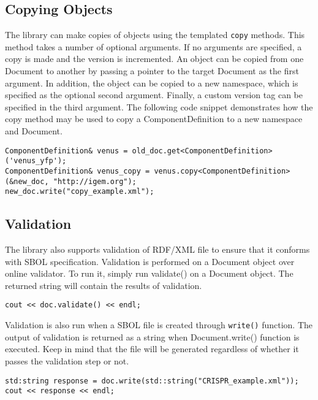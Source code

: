 \subsection*{Copying Objects}
The library can make copies of  objects using the templated \lstinline+copy+ methods.  This method takes a number of optional arguments. If no arguments are specified, a copy is made and the version is incremented. An object can be copied from one Document to another by passing a pointer to the target Document as the first argument. In addition, the object can be copied to a new namespace, which is specified as the optional second argument. Finally, a custom version tag can be specified in the third argument. The following code snippet demonstrates how the copy method may be used to copy a ComponentDefinition to a new namespace and Document.

\vspace{\abovedisplayskip}
\begin{minipage}{0.95\textwidth} 
\begin{lstlisting}
ComponentDefinition& venus = old_doc.get<ComponentDefinition>('venus_yfp');
ComponentDefinition& venus_copy = venus.copy<ComponentDefinition>(&new_doc, "http://igem.org");
new_doc.write("copy_example.xml");
\end{lstlisting}
\end{minipage}

\subsection*{Validation}
The library also supports validation of RDF/XML file to ensure that it conforms with SBOL specification. Validation is performed on a Document object over online validator. To run it, simply run validate() on a Document object. The returned string will contain the results of validation.

\vspace{\abovedisplayskip}
\begin{minipage}{0.95\textwidth} 
\begin{lstlisting}
cout << doc.validate() << endl;
\end{lstlisting}
\end{minipage}

Validation is also run when a SBOL file is created through \lstinline+write()+ function. The output of validation is returned as a string when Document.write() function is executed. Keep in mind that the file will be generated regardless of whether it passes the validation step or not.

\vspace{\abovedisplayskip}
\begin{minipage}{0.95\textwidth} 
\begin{lstlisting}
std:string response = doc.write(std::string("CRISPR_example.xml"));
cout << response << endl;
\end{lstlisting}
\end{minipage}
